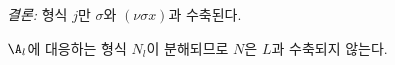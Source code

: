 
\noindent\emph{결론:} 형식 $j$만 $\sigma$와 $(\nu\sigma x)$과 수축된다.

$\A_l$에 대응하는 형식 $N_l$이 분해되므로 $N$은 $L$과 수축되지 않는다.
